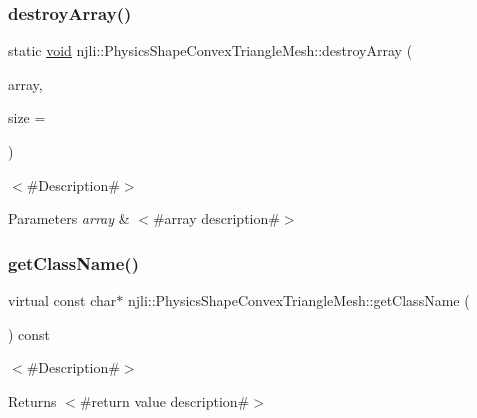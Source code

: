 \subsubsection{\texorpdfstring{destroy\+Array()}{destroyArray()}}
{\footnotesize\ttfamily static \mbox{\hyperlink{_thread_8h_af1e856da2e658414cb2456cb6f7ebc66}{void}} njli\+::\+Physics\+Shape\+Convex\+Triangle\+Mesh\+::destroy\+Array (\begin{DoxyParamCaption}\item[{\mbox{\hyperlink{classnjli_1_1_physics_shape_convex_triangle_mesh}{Physics\+Shape\+Convex\+Triangle\+Mesh}} $\ast$$\ast$}]{array,  }\item[{const \mbox{\hyperlink{_util_8h_a10e94b422ef0c20dcdec20d31a1f5049}{u32}}}]{size = {} }\end{DoxyParamCaption})\hspace{0.3cm}{\ttfamily [static]}}

$<$\#\+Description\#$>$


\begin{DoxyParams}{Parameters}
{\em array} & $<$\#array description\#$>$ \\
\hline
\end{DoxyParams}
\mbox{\label{classnjli_1_1_physics_shape_convex_triangle_mesh_af468a2dcbc7bea9b1c7fc4cefd381f6f}} 
\subsubsection{\texorpdfstring{get\+Class\+Name()}{getClassName()}}
{\footnotesize\ttfamily virtual const char$\ast$ njli\+::\+Physics\+Shape\+Convex\+Triangle\+Mesh\+::get\+Class\+Name (\begin{DoxyParamCaption}{ }\end{DoxyParamCaption}) const\hspace{0.3cm}{\ttfamily [virtual]}}

$<$\#\+Description\#$>$

\begin{DoxyReturn}{Returns}
$<$\#return value description\#$>$ 
\end{DoxyReturn}


